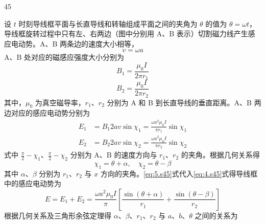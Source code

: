 \begin{solution}{45}
    \begin{subsolution}
        设 $t$ 时刻导线框平面与长直导线和转轴组成平面之间的夹角为 $\theta$ 的值为 $\theta = \omega t$，导线框旋转过程中只有左、右两边（图中分别用 A、B 表示）切割磁力线产生感应电动势。A、B 两条边的速度大小相等，
        \begin{equation}
            v = \omega a
            \label{eq:1.s45}
        \end{equation}
        A、B 处对应的磁感应强度大小分别为
        \begin{equation}
            B_{1} = \frac{\mu_{0} I}{2\pi r_{1}}
            \label{eq:2.s45}
        \end{equation}
        \begin{equation}
            B_{2} = \frac{\mu_{0} I}{2\pi r_{2}}
            \label{eq:3.s45}
        \end{equation}
        其中，$\mu_{0}$ 为真空磁导率，$r_{1}$、$r_{2}$ 分别为 A 和 B 到长直导线的垂直距离。A、B 两边对应的感应电动势分别为
        \begin{equation}
            \begin{aligned}
                E_{1} &= B_{1} 2a v \sin\chi_{1} = \frac{\omega a^{2} \mu_{0} I}{\pi r_{1}} \sin\chi_{1} \\
                E_{2} &= B_{2} 2a v \sin\chi_{2} = \frac{\omega a^{2} \mu_{0} I}{\pi r_{2}} \sin\chi_{2}
            \end{aligned}
            \label{eq:4.s45}
        \end{equation}
        式中 $\frac{\pi}{2} - \chi_{1}$、$\frac{\pi}{2} - \chi_{2}$ 分别为 A、B 的速度方向与 $r_{1}$、$r_{2}$ 的夹角。根据几何关系得
        \begin{equation}
            \chi_{1} = \theta + \alpha,\quad \chi_{2} = \theta - \beta
            \label{eq:5.s45}
        \end{equation}
        其中 $\alpha$、$\beta$ 分别为 $r_{1}$、$r_{2}$ 与 $x$ 方向的夹角。\eqref{eq:5.s45}式代入\eqref{eq:4.s45}式得导线框中的感应电动势为
        \begin{equation}
            E = E_{1} + E_{2} = \frac{\omega a^{2} \mu_{0} I}{\pi} \left[\frac{\sin(\theta + \alpha)}{r_{1}} + \frac{\sin(\theta - \beta)}{r_{2}}\right]
            \label{eq:6.s45}
        \end{equation}
        根据几何关系及三角形余弦定理得 $\alpha$、$\beta$、$r_{1}$、$r_{2}$ 与 $a$、$b$、$\theta$ 之间的关系为
        \begin{equation}

\end{equation}
\end{subsolution}
\end{solution}
